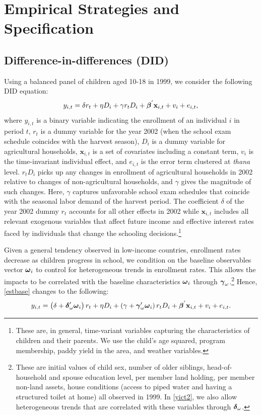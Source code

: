 \documentclass[12pt,letterpaper]{article}\usepackage[margin=1in]{geometry}
\newcommand{\bfbeta}{\ensuremath{\mbox{\boldmath $\beta$}}}
\newcommand{\bfgamma}{\ensuremath{\mbox{\boldmath $\gamma$}}}
\newcommand{\bfdelta}{\ensuremath{\mbox{\boldmath $\delta$}}}
\newcommand{\bfomega}{\ensuremath{\mbox{\boldmath $\omega$}}}
\newcommand{\0}{\ensuremath{\mbox{\boldmath $0$}}}
\begin{document}
\section{Empirical Strategies and Specification}\label{sec_empirical}
\subsection{Difference-in-differences (DID)}

Using a balanced panel of children aged 10-18 in 1999, we consider the following DID equation:
\begin{equation}
y_{i,t} = \delta r_{t} + \eta D_{i} + \gamma r_{t}D_{i} + \bfbeta^{'} \textbf{x}_{i,t} + v_{i} + e_{i,t},
\label{estbase}
\end{equation}
where $y_{i,t}$ is a binary variable indicating the enrollment of an individual $i$ in period $t$, $r_{t}$ is a dummy variable for the year 2002 (when the school exam schedule coincides with the harvest season), $D_{i}$ is a dummy variable for agricultural households, $\textbf{x}_{i,t}$ is a set of covariates including a constant term,  $v_{i}$ is the time-invariant individual effect, and $e_{i,t}$ is the error term clustered at \textit{thana} level. $r_{t}D_{i}$ picks up any changes in enrollment of agricultural households in 2002 relative to changes of non-agricultural households, and $\gamma$ gives the magnitude of such changes. Here, $\gamma$ captures unfavorable school exam schedules that coincide with the seasonal labor demand of the harvest period. The coefficient $\delta$ of the year 2002 dummy $r_{t}$ accounts for all other effects in 2002 while $\textbf{x}_{i,t}$ includes all relevant exogenous variables that affect future income and effective interest rates faced by individuals that change the schooling decisions.\footnote{These are, in general, time-variant variables capturing the characteristics of children and their parents. We use the child's age squared, program membership, paddy yield in the area, and weather variables. }

Given a general tendency observed in low-income countries, enrollment rates decrease as children progress in school, we condition on the baseline observables vector $\bfomega_{i}$ to control for heterogeneous trends in enrollment rates. This allows the impacts to be correlated with the baseline characteristics $\bfomega_{i}$ through $\bfgamma_{\omega}$.\footnote{These are initial values of child sex, number of older siblings, head-of-household and spouse education level, per member land holding, per member non-land assets, house conditions (access to piped water and having a structured toilet at home) all observed in 1999. In \eqref{yict2}, we also allow heterogeneous trends that are correlated with these variables through $\bfdelta_{\omega}$. }
Hence, \eqref{estbase} changes to the following:
\begin{equation}
y_{i,t} = 
\left(\delta +\bfdelta'_{\omega}\bfomega_{i}\right)r_{t} + \eta D_{i} +
\left(\gamma + \bfgamma'_{\omega}\bfomega_{i}\right)r_{t}D_{i} + 
\bfbeta^{'}\textbf{x}_{i,t} + v_{i} + e_{i,t}.
\label{yict2}
\end{equation}
\end{document}
